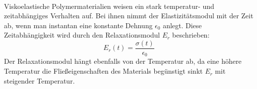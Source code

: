 \documentclass[11pt,a4paper]{article}
\numberwithin{equation}{section}
\numberwithin{figure}{section}
\begin{document}
\\
\begin{addmargin}[25pt]{0pt}
Viskoelastische Polymermaterialien weisen ein stark temperatur- und zeitabhängiges Verhalten auf. Bei ihnen nimmt der Elastizitätsmodul mit der Zeit ab, wenn man instantan eine konstante Dehnung $\epsilon_0$ anlegt. Diese Zeitabhängigkeit wird durch den Relaxationsmodul $E_r$ beschrieben:
\begin{equation}\label{eq:Relaxationsmodul}
    E_r(t) = \frac{\sigma (t)}{\epsilon_0}
\end{equation}
Der Relaxationsmodul hängt ebenfalls von der Temperatur ab, da eine höhere Temperatur die Fließeigenschaften des Materials begünstigt sinkt $E_r$ mit steigender Temperatur.\\
\end{addmargin}
\end{document}
